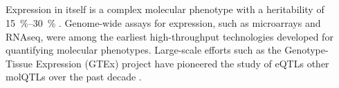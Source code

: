 \begin{outline}
\subsection{}

Expression in itself is a complex molecular phenotype with a heritability of \SIrange{15}{30}{\percent} \autocite{gaffney2013GlobalPropertiesFunctional}.
Genome-wide assays for expression, such as microarrays and \gls{RNAseq}, were among the earliest high-throughput technologies developed for quantifying molecular phenotypes.
Large-scale efforts such as the Genotype-Tissue Expression (GTEx) project \autocite{thegtexconsortium2020GTExConsortiumAtlas} have pioneered the study of \glspl{eQTL} other \glspl{molQTL} over the past decade \autocite{vandiedonck2017GeneticAssociationMolecular}.


\end{outline}
